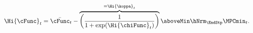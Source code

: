   \begin{equation}\begin{gathered}\begin{aligned}
        \Hi{\cFunc}_{t}  & = \bar{\cFunc}_{t}-\overbrace{\left(\frac{1}{1+\exp(\Hi{\chiFunc}_{t})}\right)}^{=\Hi{\koppa}_{t}} \aboveMin \hNrm_{\EndStp} \MPCmin_{t}. \label{eq:cFuncHi}
      \end{aligned}\end{gathered}\end{equation}
